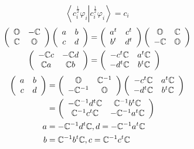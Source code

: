 \documentclass[aps,preprint]{revtex4}%
\begin{document}
\begin{equation}
\left\langle \left.  c_{i}^{\frac{1}{2}}\varphi_{i}\right\vert c_{i}^{\frac
{1}{2}}\varphi_{i}\right\rangle =c_{i}%
\end{equation}%
\begin{align}
\left(
\begin{array}
[c]{cc}%
\mathbb{O} & -\mathbb{C}\\
\mathbb{C} & \mathbb{O}%
\end{array}
\right)  \left(
\begin{array}
[c]{cc}%
a & b\\
c & d
\end{array}
\right)   &  =\left(
\begin{array}
[c]{cc}%
a^{t} & c^{t}\\
b^{t} & d^{t}%
\end{array}
\right)  \left(
\begin{array}
[c]{cc}%
\mathbb{O} & \mathbb{C}\\
-\mathbb{C} & \mathbb{O}%
\end{array}
\right)  \\
\left(
\begin{array}
[c]{cc}%
-\mathbb{C}c & -\mathbb{C}d\\
\mathbb{C}a & \mathbb{C}b
\end{array}
\right)   &  =\left(
\begin{array}
[c]{cc}%
-c^{t}\mathbb{C} & a^{t}\mathbb{C}\\
-d^{t}\mathbb{C} & b^{t}\mathbb{C}%
\end{array}
\right)
\end{align}%
\begin{align}
\left(
\begin{array}
[c]{cc}%
a & b\\
c & d
\end{array}
\right)   &  =\left(
\begin{array}
[c]{cc}%
\mathbb{O} & \mathbb{C}^{-1}\\
-\mathbb{C}^{-1} & \mathbb{O}%
\end{array}
\right)  \left(
\begin{array}
[c]{cc}%
-c^{t}\mathbb{C} & a^{t}\mathbb{C}\\
-d^{t}\mathbb{C} & b^{t}\mathbb{C}%
\end{array}
\right)  \\
&  =\left(
\begin{array}
[c]{cc}%
-\mathbb{C}^{-1}d^{t}\mathbb{C} & \mathbb{C}^{-1}b^{t}\mathbb{C}\\
\mathbb{C}^{-1}c^{t}\mathbb{C} & -\mathbb{C}^{-1}a^{t}\mathbb{C}%
\end{array}
\right)  \\
a &  =-\mathbb{C}^{-1}d^{t}\mathbb{C},d=-\mathbb{C}^{-1}a^{t}\mathbb{C}\\
b &  =\mathbb{C}^{-1}b^{t}\mathbb{C},c=\mathbb{C}^{-1}c^{t}\mathbb{C}%
\end{align}%
\end{document}
